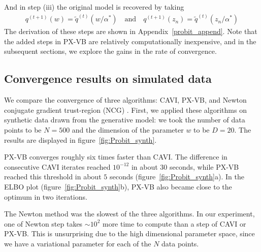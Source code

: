 \documentclass{article}
\begin{document}
And in step (iii) the original model is recovered by taking
\begin{align}
    q^{(t+1)}(w) = \tilde q^{(t)}(w/\alpha^*) \quad \text{and} \quad q^{(t+1)}(z_n) = \tilde q^{(t)}(z_n/\alpha^*)
\end{align}
The derivation of these steps are shown in Appendix~\ref{probit_append}. Note that the added steps in PX-VB are relatively computationally inexpensive, and in the subsequent sections, we explore the gains in the rate of convergence. 

\subsection{Convergence results on simulated data}
We compare the convergence of three algorithms: CAVI, PX-VB, and Newton conjugate gradient trust-region (NCG) \cite{Nocedal}. First, we applied these algorithms on synthetic data drawn from the generative model: we took the number of data points to be $N = 500$ and the dimension of the parameter $w$ to be $D= 20$. The results are displayed in figure~\ref{fig:Probit_synth}. 

PX-VB converges roughly six times faster than CAVI. The difference in consecutive CAVI iterates reached $10^{-12}$ in about 30 seconds, while PX-VB reached this threshold in about $5$ seconds  (figure~\ref{fig:Probit_synth}a). In the ELBO plot (figure~\ref{fig:Probit_synth}b), PX-VB also became close to the optimum in two iterations. %

The Newton method was the slowest of the three algorithms. In our experiment, one of Newton step takes $\sim10^2$ more time to compute than a step of CAVI or PX-VB. This is unsurprising due to the high dimensional parameter space, since we have a variational parameter for each of the $N$ data points. 
\end{document}
